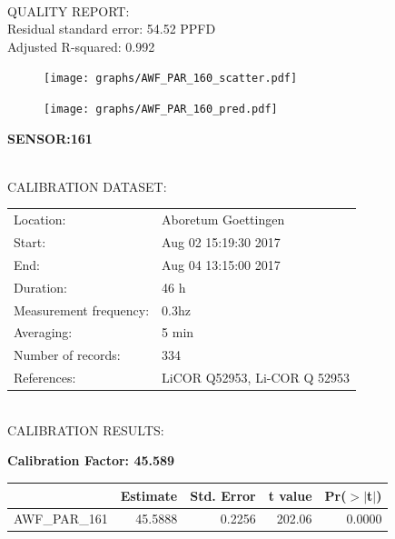\documentclass[oneside]{report}
\begin{document}
\hrulefill\\
QUALITY REPORT:\\
Residual standard error: 54.52 PPFD\\
Adjusted R-squared: 0.992



\begin{figure}[H]
  \centering
  \texttt{[image: graphs/AWF\_PAR\_160\_scatter.pdf]}
\end{figure}




\begin{figure}[H]
  \centering
  \texttt{[image: graphs/AWF\_PAR\_160\_pred.pdf]}
\end{figure}

\pagebreak


\begin{center}
\large{\textbf{SENSOR:161}}\\
\end{center}

\hrulefill\\
CALIBRATION DATASET:\\
\begin{table}[h!]
  \centering
  \label{tab:table1}
  \begin{tabular}{ll}
    Location: & Aboretum Goettingen\\ 
    
    
    Start:  & Aug 02 15:19:30 2017 \\
    End:   & Aug 04 13:15:00 2017\\ 
    Duration: & 46 h\\
    Measurement frequency: & 0.3hz\\
    Averaging:  &5 min\\
    Number of records: & 334 \\
    References: & LiCOR Q52953, Li-COR Q 52953 \\
  \end{tabular}
\end{table}

\hrulefill\\
CALIBRATION RESULTS:\\


\begin{center}
\textbf{\large{Calibration Factor: 45.589}}\\
\end{center}
\begin{table}[ht]
\centering
\begin{tabular}{rrrrr}
  \hline
 & Estimate & Std. Error & t value & Pr($>$$|$t$|$) \\ 
  \hline
AWF\_PAR\_161 & 45.5888 & 0.2256 & 202.06 & 0.0000 \\ 
   \hline
\end{tabular}
\end{table}
\end{document}
